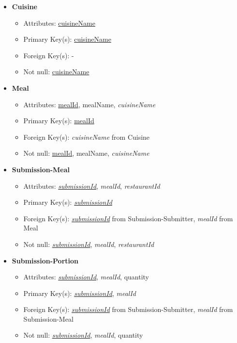 \documentclass{article}
\begin{document}
\begin{itemize}
        \item \textbf{Cuisine}
        \begin{itemize}
            \item Attributes: \underline{cuisineName}
            \item Primary Key(s): \underline{cuisineName}
            \item Foreign Key(s): -
            \item Not null: \underline{cuisineName}
        \end{itemize}
        
        \item \textbf{Meal}
        \begin{itemize}
            \item Attributes: \underline{mealId}, mealName, \textit{cuisineName}
            \item Primary Key(s): \underline{mealId}
            \item Foreign Key(s): \textit{cuisineName} from Cuisine
            \item Not null: \underline{mealId}, mealName, \textit{cuisineName}
        \end{itemize}

        \item \textbf{Submission-Meal}
        \begin{itemize}
            \item Attributes: \underline{\textit{submissionId}}, \textit{mealId}, \textit{restaurantId}
            \item Primary Key(s): \underline{\textit{submissionId}}
            \item Foreign Key(s): \underline{\textit{submissionId}} from Submission-Submitter, \textit{mealId} from Meal            
            \item Not null: \underline{\textit{submissionId}}, \textit{mealId}, \textit{restaurantId}
        \end{itemize}

        \item \textbf{Submission-Portion}
        \begin{itemize}
            \item Attributes: \underline{\textit{submissionId}}, \textit{mealId}, quantity
            \item Primary Key(s): \underline{\textit{submissionId}}, \textit{mealId}
            \item Foreign Key(s): \underline{\textit{submissionId}} from Submission-Submitter, \textit{mealId} from Submission-Meal
            \item Not null: \underline{\textit{submissionId}}, \textit{mealId}, quantity
        \end{itemize}


\end{itemize}
\end{document}
